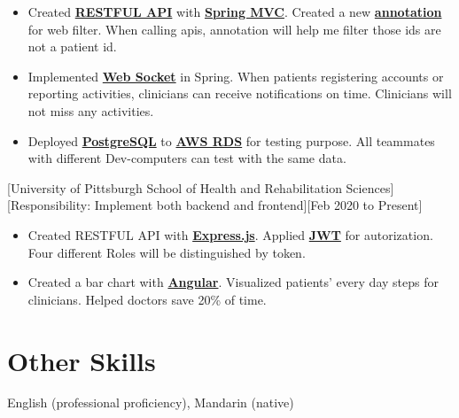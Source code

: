 \documentclass{article}
\begin{document}
\begin{itemize}
\item Created \textbf{\underline{RESTFUL API}} with \textbf{\underline{Spring MVC}}. Created a new \textbf{\underline{annotation}} for web filter. When calling apis, annotation will help me filter those ids are not a patient id.

\item Implemented \textbf{\underline{Web Socket}} in Spring. When patients registering accounts or reporting activities, clinicians can receive notifications on time. Clinicians will not miss any activities. 

\item Deployed \textbf{\underline{PostgreSQL}} to \textbf{\underline{AWS RDS}} for testing purpose. All teammates with different Dev-computers can test with the same data.
\end{itemize}

[University of Pittsburgh School of Health and Rehabilitation Sciences]
[Responsibility: Implement both backend and frontend][Feb 2020 to Present]
\begin{itemize}
\item Created RESTFUL API with \textbf{\underline{Express.js}}. Applied \textbf{\underline{JWT}} for autorization. Four different Roles will be distinguished by token. 

\item Created a bar chart with \textbf{\underline{Angular}}. Visualized patients' every day steps for clinicians. Helped doctors save 20\% of time.
\end{itemize}

\section{Other Skills}
\begin{description}[widest=Languages]
\item[Languages]	English (professional proficiency), Mandarin (native) 
\end{description}
\end{document}
